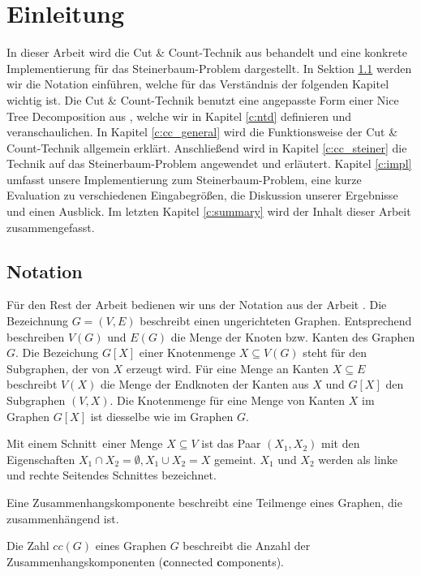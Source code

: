 \section{Einleitung}
\label{c:intro} %
In dieser Arbeit wird die Cut \& Count-Technik aus \cite{cygan_solving_2011} behandelt und eine konkrete Implementierung für das Steinerbaum-Problem dargestellt. 
In Sektion \ref{sec:intro_not} werden wir die Notation einführen, welche für das Verständnis der folgenden Kapitel wichtig ist. 
Die Cut \& Count-Technik benutzt eine angepasste Form einer Nice Tree Decomposition aus \cite{kloks1994}, welche wir in Kapitel \ref{c:ntd} definieren und veranschaulichen.
In Kapitel \ref{c:cc_general} wird die Funktionsweise der Cut \& Count-Technik allgemein erklärt. 
Anschließend wird in Kapitel \ref{c:cc_steiner} die Technik auf das Steinerbaum-Problem angewendet und erläutert. 
Kapitel \ref{c:impl} umfasst unsere Implementierung zum Steinerbaum-Problem, eine kurze Evaluation zu verschiedenen Eingabegrößen, die Diskussion unserer Ergebnisse und einen Ausblick. 
Im letzten Kapitel \ref{c:summary} wird der Inhalt dieser Arbeit zusammengefasst.

\subsection{Notation}
\label{sec:intro_not}
Für den Rest der Arbeit bedienen wir uns der Notation aus der Arbeit \cite{cygan_solving_2011}. 
Die Bezeichnung $G=(V,E)$ beschreibt einen ungerichteten Graphen. Entsprechend beschreiben $V(G)$ und $E(G)$ die Menge der Knoten bzw. Kanten des Graphen $G$. 
Die Bezeichung $G[X]$ einer Knotenmenge $X \subseteq V(G)$ steht für den Subgraphen, der von $X$ erzeugt wird. Für eine Menge an Kanten $X \subseteq E$ beschreibt $V(X)$ die Menge der Endknoten der Kanten aus $X$ und $G[X]$ den Subgraphen $(V,X)$. 
Die Knotenmenge für eine Menge von Kanten $X$ im Graphen $G[X]$ ist diesselbe wie im Graphen $G$.

Mit einem \glqq Schnitt\grqq ~einer Menge $X \subseteq V$ ist das Paar $(X_1,X_2)$ mit den Eigenschaften $X_1 \cap X_2 = \emptyset,X_1 \cup X_2 = X$ gemeint. 
$X_1$ und $X_2$ werden als linke und rechte \glqq Seiten\grqq des Schnittes bezeichnet. 

Eine Zusammenhangskomponente beschreibt eine Teilmenge eines Graphen, die zusammenhängend ist.

Die Zahl $cc(G)$ eines Graphen $G$ beschreibt die Anzahl der Zusammenhangskomponenten (\glqq \textbf{c}onnected \textbf{c}omponents\grqq).

